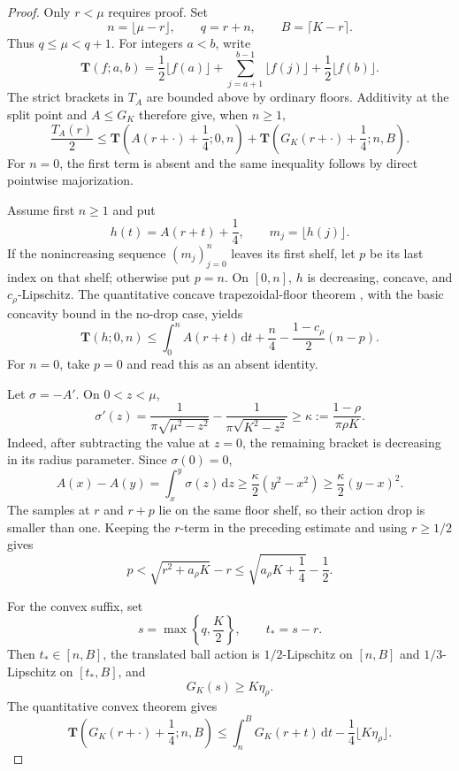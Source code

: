 \documentclass[11pt]{article}
\theoremstyle{remark}
\newcommand{\dd}{\,\mathrm d}
\begin{document}
\begin{proof}
Only $r<\mu$ requires proof.  Set
\[
 n=\lfloor\mu-r\rfloor,
 \qquad q=r+n,
 \qquad B=\lceil K-r\rceil.
\]
Thus $q\leq\mu<q+1$.  For integers $a<b$, write
\[
 \mathbf T(f;a,b)=\frac12\lfloor f(a)\rfloor
 +\sum_{j=a+1}^{b-1}\lfloor f(j)\rfloor
 +\frac12\lfloor f(b)\rfloor.
\]
The strict brackets in $T_A$ are bounded above by ordinary floors.
Additivity at the split point and $A\leq G_K$ therefore give, when
$n\geq1$,
\begin{equation}
 \frac{T_A(r)}2\leq
 \mathbf T\left(A(r+\cdot)+\frac14;0,n\right)
 +\mathbf T\left(G_K(r+\cdot)+\frac14;n,B\right).
 \label{eq:high-energy-split}
\end{equation}
For $n=0$, the first term is absent and the same inequality follows by
direct pointwise majorization.

Assume first $n\geq1$ and put
\[
 h(t)=A(r+t)+\frac14,
 \qquad m_j=\lfloor h(j)\rfloor.
\]
If the nonincreasing sequence $(m_j)_{j=0}^n$ leaves its first shelf, let
$p$ be its last index on that shelf; otherwise put $p=n$.  On $[0,n]$,
$h$ is decreasing, concave, and $c_\rho$-Lipschitz.  The quantitative
concave trapezoidal-floor theorem
\cite[Theorem~1.4]{FLPSannuli}, with the basic concavity bound in the
no-drop case, yields
\begin{equation}
 \mathbf T(h;0,n)
 \leq\int_0^n A(r+t)\dd t+\frac n4
 -\frac{1-c_\rho}{2}(n-p).
 \label{eq:concave-head-gain}
\end{equation}
For $n=0$, take $p=0$ and read this as an absent identity.

Let $\sigma=-A'$.  On $0<z<\mu$,
\[
 \sigma'(z)=\frac1{\pi\sqrt{\mu^2-z^2}}
 -\frac1{\pi\sqrt{K^2-z^2}}
 \geq\kappa:=\frac{1-\rho}{\pi\rho K}.
\]
Indeed, after subtracting the value at $z=0$, the remaining bracket is
decreasing in its radius parameter.  Since $\sigma(0)=0$,
\[
 A(x)-A(y)=\int_x^y\sigma(z)\dd z
 \geq\frac\kappa2(y^2-x^2)
 \geq\frac\kappa2(y-x)^2.
\]
The samples at $r$ and $r+p$ lie on the same floor shelf, so their action
drop is smaller than one.  Keeping the $r$-term in the preceding estimate
and using $r\geq1/2$ gives
\begin{equation}
 p<\sqrt{r^2+a_\rho K}-r
 \leq\sqrt{a_\rho K+\frac14}-\frac12.
 \label{eq:first-shelf-length}
\end{equation}

For the convex suffix, set
\[
 s=\max\left\{q,\frac K2\right\},
 \qquad t_*=s-r.
\]
Then $t_*\in[n,B]$, the translated ball action is
$1/2$-Lipschitz on $[n,B]$ and $1/3$-Lipschitz on $[t_*,B]$, and
\[
 G_K(s)\geq K\eta_\rho.
\]
The quantitative convex theorem \cite[Theorem~3.4]{FLPSannuli} gives
\begin{equation}
 \mathbf T\left(G_K(r+\cdot)+\frac14;n,B\right)
 \leq\int_n^B G_K(r+t)\dd t
 -\frac14\lfloor K\eta_\rho\rfloor.
 \label{eq:convex-suffix-gain}
\end{equation}


\end{proof}
\end{document}
